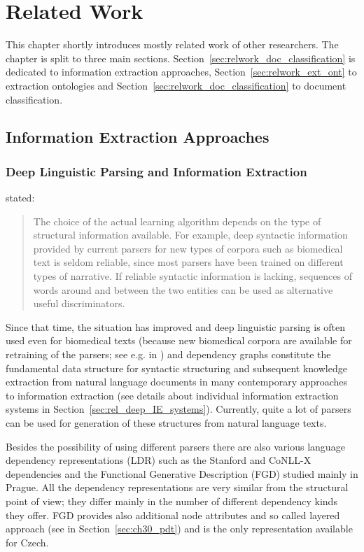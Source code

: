 \chapter{Related Work} \label{sec:ch_related}

This chapter shortly introduces mostly related work of other researchers. The chapter is split to three main sections. Section~\ref{sec:relwork_doc_classification} is dedicated to information extraction approaches, Section~\ref{sec:relwork_ext_ont} to extraction ontologies and Section~\ref{sec:relwork_doc_classification} to document classification.

\section{Information Extraction Approaches} \label{sec:relwork_ie}

\subsection{Deep Linguistic Parsing and Information Extraction}

\cite{Bunescu:phd} stated: 
\begin{quotation}
The choice of the actual learning algorithm depends on the type of structural information available. For example, deep syntactic information provided by current parsers for new types of corpora such as biomedical text is seldom reliable, since most parsers have been trained on different types of narrative. If reliable syntactic information is lacking, sequences of words around and between the two entities can be used as alternative useful discriminators.	
\end{quotation}
Since that time, the situation has improved and deep linguistic parsing is often used even for biomedical texts (because new biomedical corpora are available for retraining of the parsers; see e.g. in \citep{Buyko:2010:EIA:1870658.1870754}) and  dependency graphs constitute the fundamental data structure for syntactic structuring and subsequent knowledge extraction from natural language documents in many contemporary approaches to information extraction (see details about individual information extraction systems in Section~\ref{sec:rel_deep_IE_systems}). Currently, quite a lot of parsers can be used for generation of these structures from natural language texts. 

Besides the possibility of using different parsers there are also various language dependency representations (LDR) such as the Stanford \citep{stanfordDeps} and CoNLL-X \citep{johansson2007a} dependencies and the Functional Generative Description (FGD) \citep{SgallHajicovaPanevova1986} studied mainly in Prague. All the dependency representations are very similar from the structural point of view; they differ mainly in the number of different dependency kinds they offer. FGD provides also additional node attributes and so called layered approach (see in Section~\ref{sec:ch30_pdt}) and is the only representation available for Czech.


